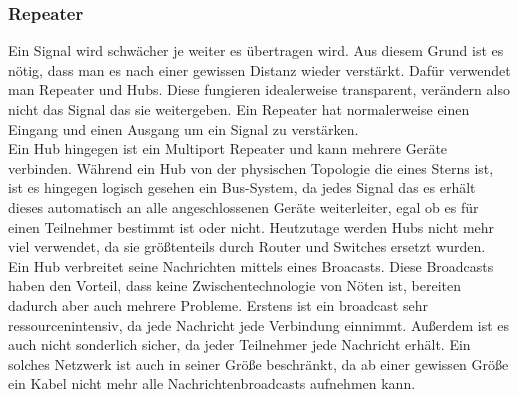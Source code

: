 \documentclass{article}
\begin{document}
	 \subsubsection{Repeater}
	 Ein Signal wird schwächer je weiter es übertragen wird. Aus diesem Grund ist es nötig, dass man es nach einer gewissen Distanz wieder verstärkt. Dafür verwendet man Repeater und Hubs. Diese fungieren idealerweise transparent, verändern also nicht das Signal das sie weitergeben. Ein Repeater hat normalerweise einen Eingang und einen Ausgang um ein Signal zu verstärken. \\
	 Ein Hub hingegen ist ein Multiport Repeater und kann mehrere Geräte verbinden. Während ein Hub von der physischen Topologie die eines Sterns ist, ist es hingegen logisch gesehen ein Bus-System, da jedes Signal das es erhält dieses automatisch an alle angeschlossenen Geräte weiterleiter, egal ob es für einen Teilnehmer bestimmt ist oder nicht. Heutzutage werden Hubs nicht mehr viel verwendet, da sie größtenteils durch Router und Switches ersetzt wurden. \\
	 Ein Hub verbreitet seine Nachrichten mittels eines Broacasts. Diese Broadcasts haben den Vorteil, dass keine Zwischentechnologie von Nöten ist, bereiten dadurch aber auch mehrere Probleme. Erstens ist ein broadcast sehr ressourcenintensiv, da jede Nachricht jede Verbindung einnimmt. Außerdem ist es auch nicht sonderlich sicher, da jeder Teilnehmer jede Nachricht erhält. Ein solches Netzwerk ist auch in seiner Größe beschränkt, da ab einer gewissen Größe ein Kabel nicht mehr alle Nachrichtenbroadcasts aufnehmen kann. \\
\end{document}
